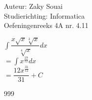\documentclass[a4paper]{article}
\begin{document}
  
\noindent \large Auteur: Zaky Souai \\
\noindent \large Studierichting:  Informatica\\
\noindent \large Oefeningenreeks 4A nr. 4.11\\

\bigskip

\normalsize

$\displaystyle\int \dfrac{x\sqrt{x}\sqrt[3]{x}}{\sqrt[4]{x}} dx $ \\

$ = \displaystyle\int x^{\tfrac{19}{12}} dx $ \\

$ = \dfrac{12x^{\tfrac{31}{12}}}{31} + C $ \\ 

\begin{thebibliography}{999}
\end{thebibliography}
\end{document}
